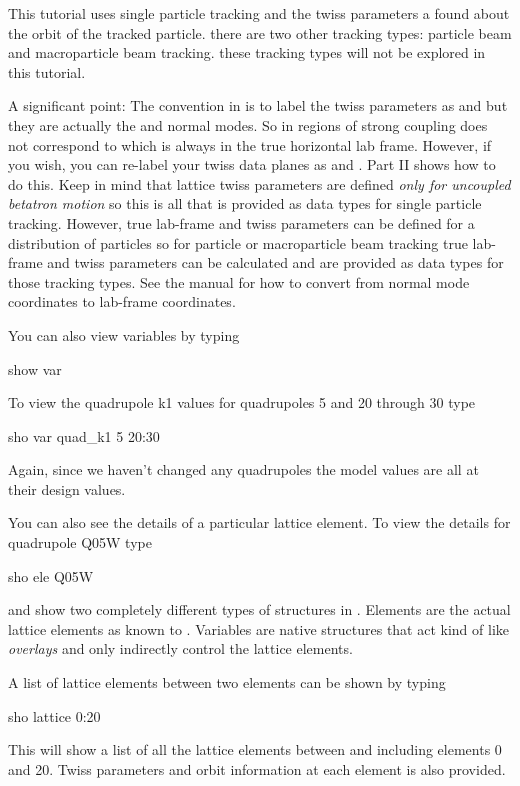 This tutorial uses single particle tracking and the twiss parameters a found
about the orbit of the tracked particle. there are two other tracking types:
particle beam and macroparticle beam tracking. these tracking types will not be
explored in this tutorial.

A significant point: The convention in \bmad is to label the twiss
parameters as  and  but they are actually the  and 
normal modes. So in regions of strong coupling  does not correspond
to  which is always in the true horizontal lab frame.  However, if
you wish, you can re-label your twiss data planes as  and . Part II
shows how to do this. Keep in mind that lattice twiss parameters are defined
\textit{only for uncoupled betatron motion} so this is all that is provided as
data types for single particle tracking.  However, true lab-frame   and
 twiss parameters can be defined for a distribution of particles so for
particle or macroparticle beam tracking true lab-frame  and  twiss
parameters can be calculated and are provided as data types for those tracking
types. See the \bmad manual for how to convert from normal mode coordinates to
lab-frame coordinates.

You can also view variables by typing
\begin{example}
  show var
\end{example}
To view the quadrupole k1 values for \cesr quadrupoles 5  and 20 through 30 type
\begin{example}
  sho var quad\_k1 5 20:30
\end{example}
Again, since we haven't changed any quadrupoles the model values are all at their
design values.

You can also see the details of a particular lattice element. To view the details
for quadrupole Q05W type
\begin{example}
  sho ele Q05W
\end{example}

 and  show two completely different types of
structures in \tao. Elements are the actual lattice elements as known to \bmad. 
Variables are native \tao structures that act kind of like \bmad
\textit{overlays} and only indirectly control the lattice elements.

A list of lattice elements between two elements can be shown by typing 
\begin{example}
  sho lattice 0:20
\end{example}
This will show a list of all the lattice elements between and including elements
0 and 20. Twiss parameters and orbit information at each element is also
provided.

